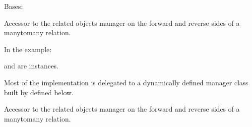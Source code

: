 \documentclass[letterpaper,10pt,english]{sphinxmanual}
\begin{document}
\begin{fulllineitems}
\begin{fulllineitems}
\label{\detokenize{app:app.models.modele_io_mapping.MultipleObjectsReturned}}
\pysigstartsignatures
{}
\pysigstopsignatures
\sphinxAtStartPar
Bases: 

\end{fulllineitems}


\begin{fulllineitems}
\label{\detokenize{app:app.models.modele_io_mapping.interfaces}}
\pysigstartsignatures
{}
\pysigstopsignatures
\sphinxAtStartPar
Accessor to the related objects manager on the forward and reverse sides of
a many\sphinxhyphen{}to\sphinxhyphen{}many relation.

\sphinxAtStartPar
In the example:

\begin{sphinxVerbatim}[commandchars=\\\{\}]
 
       
\end{sphinxVerbatim}

\sphinxAtStartPar
{} and  are 
instances.

\sphinxAtStartPar
Most of the implementation is delegated to a dynamically defined manager
class built by  defined below.

\end{fulllineitems}


\begin{fulllineitems}
\label{\detokenize{app:app.models.modele_io_mapping.iotypes}}
\pysigstartsignatures
{}
\pysigstopsignatures
\sphinxAtStartPar
Accessor to the related objects manager on the forward and reverse sides of
a many\sphinxhyphen{}to\sphinxhyphen{}many relation.


\end{fulllineitems}
\end{fulllineitems}
\end{document}
